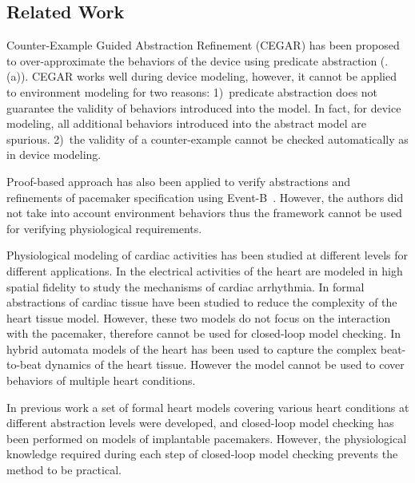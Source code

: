 \subsection{Related Work}
Counter-Example Guided Abstraction Refinement (CEGAR) \cite{CEGAR} has been proposed to over-approximate the behaviors of the device using predicate abstraction (.(a)).
CEGAR works well during device modeling, however, it cannot be applied to environment modeling for two reasons: 1)~predicate abstraction does not guarantee the validity of behaviors introduced into the model. In fact, for device modeling, all additional behaviors introduced into the abstract model are spurious. 2)~the validity of a counter-example cannot be checked automatically as in device modeling. 

Proof-based approach has also been applied to verify  abstractions and refinements of pacemaker specification using Event-B~\cite{eventb}. However, the authors did not take into account environment behaviors thus the framework cannot be used for verifying physiological requirements.  

Physiological modeling of cardiac activities has been studied at different levels for different applications. In \cite{natalia} the electrical activities of the heart are modeled in high spatial fidelity to study the mechanisms of cardiac arrhythmia. In \cite{radu} formal abstractions of cardiac tissue have been studied to reduce the complexity of the heart tissue model. However, these two models do not focus on the interaction with the pacemaker, therefore cannot be used for closed-loop model checking. In \cite{marta} hybrid automata models of the heart has been used to capture the complex beat-to-beat dynamics of the heart tissue. However the model cannot be used to cover behaviors of multiple heart conditions.

In previous work \cite{sttt13} a set of formal heart models covering various heart conditions at different abstraction levels were developed, and closed-loop model checking has been performed on models of implantable pacemakers. 
However, the physiological knowledge required during each step of closed-loop model checking prevents the method to be practical.

